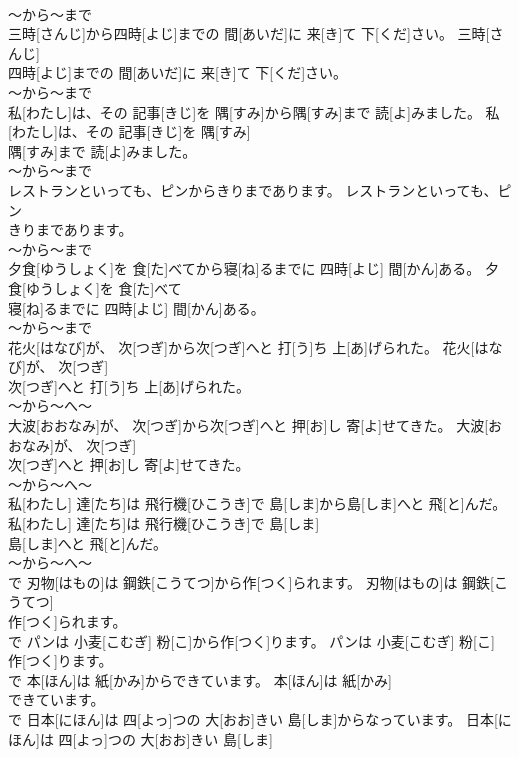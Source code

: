 \documentclass[8pt]{extreport}
\begin{document}
\begin{CJK}{UTF8}{min}
\\	～から～まで 
\\	三時[さんじ]から四時[よじ]までの 間[あいだ]に 来[き]て 下[くだ]さい。	三時[さんじ]
\\	四時[よじ]までの 間[あいだ]に 来[き]て 下[くだ]さい。	
\\	～から～まで 
\\	私[わたし]は、その 記事[きじ]を 隅[すみ]から隅[すみ]まで 読[よ]みました。	私[わたし]は、その 記事[きじ]を 隅[すみ]
\\	隅[すみ]まで 読[よ]みました。	
\\	～から～まで 
\\	レストランといっても、ピンからきりまであります。	レストランといっても、ピン
\\	きりまであります。	
\\	～から～まで 
\\	夕食[ゆうしょく]を 食[た]べてから寝[ね]るまでに 四時[よじ] 間[かん]ある。	夕食[ゆうしょく]を 食[た]べて
\\	寝[ね]るまでに 四時[よじ] 間[かん]ある。	
\\	～から～まで 
\\	花火[はなび]が、 次[つぎ]から次[つぎ]へと 打[う]ち 上[あ]げられた。	花火[はなび]が、 次[つぎ]
\\	次[つぎ]へと 打[う]ち 上[あ]げられた。	
\\	～から～へ～ 
\\	大波[おおなみ]が、 次[つぎ]から次[つぎ]へと 押[お]し 寄[よ]せてきた。	大波[おおなみ]が、 次[つぎ]
\\	次[つぎ]へと 押[お]し 寄[よ]せてきた。	
\\	～から～へ～ 
\\	私[わたし] 達[たち]は 飛行機[ひこうき]で 島[しま]から島[しま]へと 飛[と]んだ。	私[わたし] 達[たち]は 飛行機[ひこうき]で 島[しま]
\\	島[しま]へと 飛[と]んだ。	
\\	～から～へ～ 
\\	で	刃物[はもの]は 鋼鉄[こうてつ]から作[つく]られます。	刃物[はもの]は 鋼鉄[こうてつ]
\\	作[つく]られます。	
\\	で	パンは 小麦[こむぎ] 粉[こ]から作[つく]ります。	パンは 小麦[こむぎ] 粉[こ]
\\	作[つく]ります。	
\\	で	本[ほん]は 紙[かみ]からできています。	本[ほん]は 紙[かみ]
\\	できています。	
\\	で	日本[にほん]は 四[よっ]つの 大[おお]きい 島[しま]からなっています。	日本[にほん]は 四[よっ]つの 大[おお]きい 島[しま]

\end{CJK}
\end{document}
